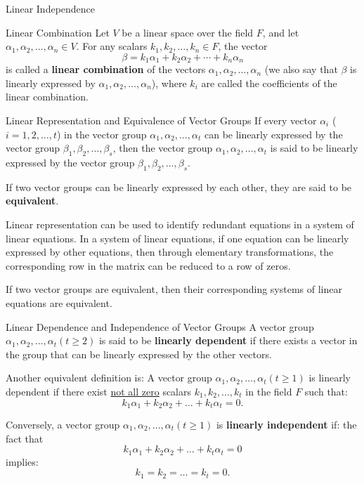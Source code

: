 \documentclass[11pt]{../../TexTemplate/elegantbook} %
\begin{document}
\begin{leftbarTitle}{Linear Independence}\end{leftbarTitle}
\begin{definition}{Linear Combination}
    Let \( V \) be a linear space over the field \( F \), 
    and let \( \alpha_1, \alpha_2, \ldots, \alpha_n \in V \).
    For any scalars \( k_1, k_2, \ldots, k_n \in F \), the vector
    \[
    \beta = k_1\alpha_1 + k_2\alpha_2 + \cdots + k_n\alpha_n
    \]
    is called a \textbf{linear combination} of the vectors \( \alpha_1, \alpha_2, \ldots, \alpha_n \)
    (we also say that \( \beta \) is linearly expressed by \( \alpha_1, \alpha_2, \ldots, \alpha_n \)),
    where \( k_i \) are called the coefficients of the linear combination.
\end{definition}

\begin{definition}{Linear Representation and Equivalence of Vector Groups}
    If every vector \( \alpha_i \) (\( i = 1, 2, \dots, t \)) in the vector group 
    \( \alpha_1, \alpha_2, \dots, \alpha_t \) can be linearly expressed by the vector group 
    \( \beta_1, \beta_2, \dots, \beta_s \), then the vector group 
    \( \alpha_1, \alpha_2, \dots, \alpha_t \) is said to be linearly expressed by the vector group 
    \( \beta_1, \beta_2, \dots, \beta_s \).

    If two vector groups can be linearly expressed by each other, 
    they are said to be \textbf{equivalent}.
\end{definition}



\begin{remark}
    Linear representation can be used to identify redundant equations in a system of linear equations. 
    In a system of linear equations, if one equation can be linearly expressed by other equations, 
    then through elementary transformations, the corresponding row in the matrix can be reduced to a row of zeros.

    If two vector groups are equivalent, then their corresponding systems of linear equations are equivalent.
\end{remark}

\begin{definition}{Linear Dependence and Independence of Vector Groups}
    A vector group \( \alpha_1, \alpha_2, \dots, \alpha_t (t \geq 2) \) is said to be \textbf{linearly dependent} 
    if there exists a vector in the group that can be linearly expressed by the other vectors. 
    
    Another equivalent definition is:
    A vector group \( \alpha_1, \alpha_2, \dots, \alpha_t (t \geq 1) \) is linearly dependent 
    if there exist \underline{not all zero} scalars \( k_1, k_2, \dots, k_t \) in the field \( F \) such that:
    \[
    k_1 \alpha_1 + k_2 \alpha_2 + \dots + k_t \alpha_t = 0.
    \]

    Conversely, a vector group \( \alpha_1, \alpha_2, \dots, \alpha_t (t \geq 1) \) is \textbf{linearly independent} if:
    the fact that
    \[
    k_1 \alpha_1 + k_2 \alpha_2 + \dots + k_t \alpha_t = 0
    \]
    implies:
    \[
    k_1 = k_2 = \dots = k_t = 0.
    \]    
\end{definition}
\end{document}
